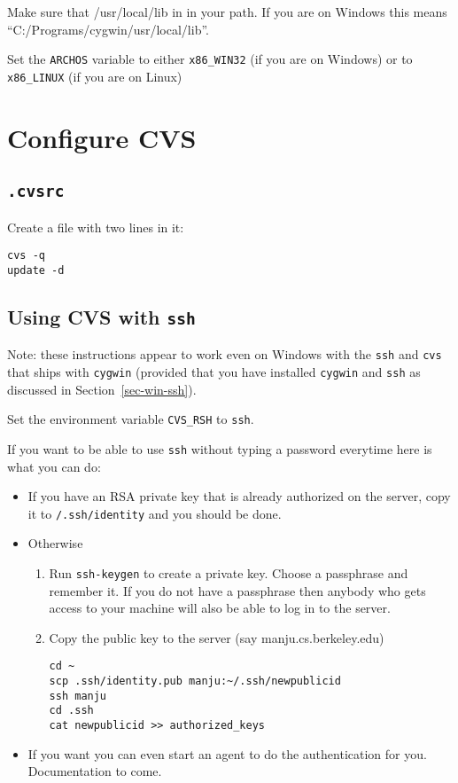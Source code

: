 \documentclass{article}
\def\t#1{{\tt #1}}
\begin{document}
 Make sure that /usr/local/lib in in your path. If you are on Windows this
 means ``C:/Programs/cygwin/usr/local/lib''. 

 Set the \t{ARCHOS} variable to either \t{x86\_WIN32} (if you are on Windows)
 or to \t{x86\_LINUX} (if you are on Linux)


\section{Configure CVS}

 \subsection{\t{.cvsrc}}

 Create a  file with two lines in it: 
\begin{verbatim}
cvs -q
update -d
\end{verbatim}

 \subsection{Using CVS with \t{ssh}}

 Note: these instructions appear to work even on Windows with the \t{ssh} and
\t{cvs} that ships with \t{cygwin} (provided that you have installed
\t{cygwin} and \t{ssh} as discussed in Section~\ref{sec-win-ssh}).

 Set the environment variable \t{CVS\_RSH} to \t{ssh}. 

 If you want to be able to use \t{ssh} without typing a password everytime
 here is what you can do:

\begin{itemize}
\item If you have an RSA private key that is already authorized on the server,
copy it to \t{\home{}/.ssh/identity} and you should be done.
\item Otherwise
   \begin{enumerate}
     \item Run \t{ssh-keygen} to create a private key. Choose a passphrase and
      remember it. If you do not have a passphrase then anybody who gets
      access to your machine will also be able to log in to the server.
     \item Copy the public key to the server (say manju.cs.berkeley.edu)
\begin{verbatim}
cd ~
scp .ssh/identity.pub manju:~/.ssh/newpublicid
ssh manju
cd .ssh
cat newpublicid >> authorized_keys
\end{verbatim}

   \end{enumerate}

\item If you want you can even start an agent to do the authentication for
you. Documentation to come.
\end{itemize}
\end{document}
